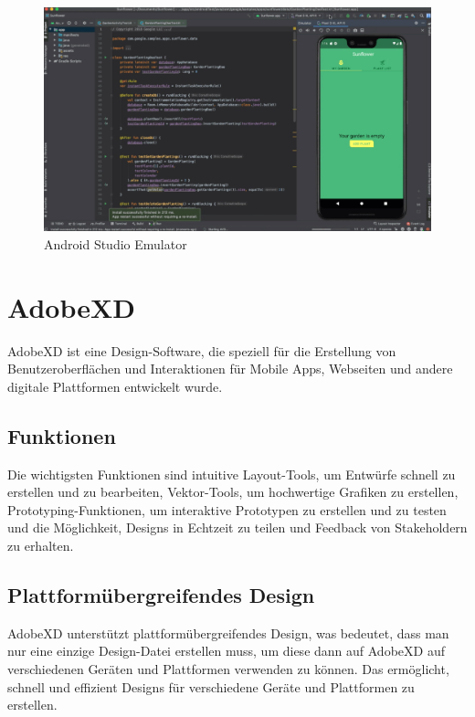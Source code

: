 \begin{figure}[H]
    \centering
    \includegraphics[scale=0.2]{pics/android-studio-emulator.jpg}
    \caption{Android Studio Emulator}
\end{figure}

\section{AdobeXD}

    AdobeXD \cite{AdobeXDDefinition} ist eine Design-Software, die speziell für die Erstellung von Benutzeroberflächen und Interaktionen für Mobile Apps, Webseiten und andere digitale Plattformen entwickelt wurde.

\subsection*{Funktionen}
Die wichtigsten Funktionen sind intuitive Layout-Tools, um Entwürfe schnell zu erstellen und zu bearbeiten, Vektor-Tools, um hochwertige Grafiken zu erstellen, Prototyping-Funktionen, um interaktive Prototypen zu erstellen und zu testen und die Möglichkeit, Designs in Echtzeit zu teilen und Feedback von Stakeholdern zu erhalten.

\subsection*{Plattformübergreifendes Design} 
AdobeXD unterstützt plattformübergreifendes Design, was bedeutet, dass man nur eine einzige Design-Datei erstellen muss, um diese dann auf AdobeXD auf verschiedenen Geräten und Plattformen verwenden zu können. 
Das ermöglicht, schnell und effizient Designs für verschiedene Geräte und Plattformen zu erstellen.

